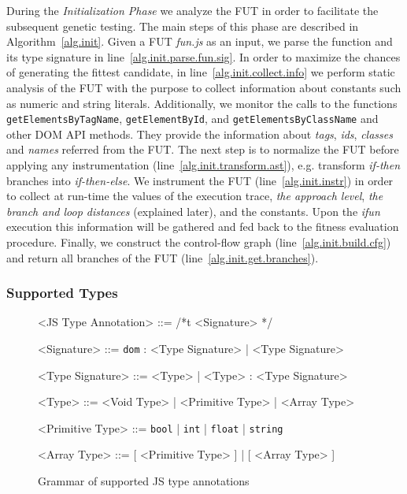 During the \emph{Initialization Phase} we analyze the FUT in order to facilitate the subsequent genetic testing. The main steps of this phase are described in Algorithm~\ref{alg.init}. Given a FUT \emph{fun.js} as an input, we parse the function and its type signature in line~\ref{alg.init.parse.fun.sig}. In order to maximize the chances of generating the fittest candidate, in line~\ref{alg.init.collect.info} we perform static analysis of the FUT with the purpose to collect information about constants such as numeric and string literals. Additionally, we monitor the calls to the functions \texttt{getElementsByTagName}, \texttt{getElementById}, and \texttt{getElementsByClassName} and other DOM API methods. They provide the information about \emph{tags}, \emph{ids}, \emph{classes} and \emph{names} referred from the FUT. The next step is to normalize the FUT before applying any instrumentation (line~\ref{alg.init.transform.ast}), e.g. transform \emph{if-then} branches into \emph{if-then-else}. We instrument the FUT (line~\ref{alg.init.instr}) in order to collect at run-time the values of the execution trace, \emph{the approach level}, \emph{the branch and loop distances} (explained later), and the constants. Upon the \emph{ifun} execution this information will be gathered and fed back to the fitness evaluation procedure. Finally, we construct the control-flow graph (line~\ref{alg.init.build.cfg}) and return all branches of the FUT (line~\ref{alg.init.get.branches}).

\subsubsection{Supported Types}
\label{sub.sec.sup.types}

\begin{figure}[!t]
\setlength{\grammarparsep}{3pt}
\scriptsize
\begin{grammar}
<JS Type Annotation> ::= /*t <Signature> */

<Signature> ::= \texttt{dom} : <Type Signature> | <Type Signature>

<Type Signature> ::= <Type> | <Type> : <Type Signature>

<Type> ::= <Void Type> | <Primitive Type> | <Array Type>

<Primitive Type> ::= \texttt{bool} | \texttt{int} | \texttt{float} | \texttt{string}

<Array Type> ::= [ <Primitive Type> ] | [ <Array Type> ]
\end{grammar}
\caption{Grammar of supported JS type annotations}
\label{fig.js.type.annot}
\end{figure}

